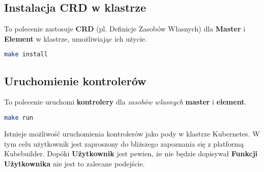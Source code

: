 \subsection{Instalacja CRD w klastrze}

To polecenie zastosuje \textbf{CRD} (pl. Definicje Zasobów Własnych) dla \textbf{Master} i \textbf{Element} w klastrze, umożliwiając ich użycie.

\begin{lstlisting}[language=bash, caption={Instalacja CRD}]
make install
\end{lstlisting}

\subsection{Uruchomienie kontrolerów }

To polecenie uruchomi \textbf{kontrolery} dla \textit{zasobów własnych} \textbf{master} i \textbf{element}.

\begin{lstlisting}[language=bash, caption={Uruchomienie kontrolerów}]
make run
\end{lstlisting}

Istnieje możliwość uruchomienia kontrolerów jako pody w klastrze Kubernetes. W tym celu użytkownik jest zaproszony do bliższego zapoznania się z platformą Kubebuilder. Dopóki \textbf{Użytkownik} jest pewien, że nie będzie dopisywał \textbf{Funkcji Użytkownika} nie jest to zalecane podejście. 


